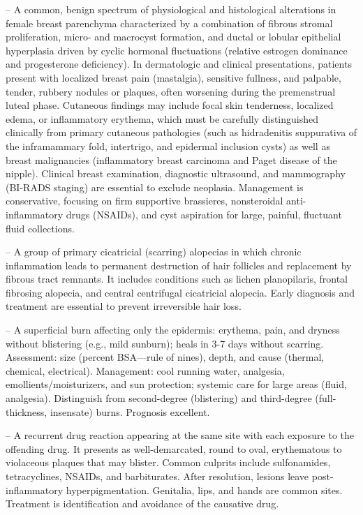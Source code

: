 -- A common, benign spectrum of physiological and histological alterations in female breast parenchyma characterized by a combination of fibrous stromal proliferation, micro- and macrocyst formation, and ductal or lobular epithelial hyperplasia driven by cyclic hormonal fluctuations (relative estrogen dominance and progesterone deficiency). In dermatologic and clinical presentations, patients present with localized breast pain (mastalgia), sensitive fullness, and palpable, tender, rubbery nodules or plaques, often worsening during the premenstrual luteal phase. Cutaneous findings may include focal skin tenderness, localized edema, or inflammatory erythema, which must be carefully distinguished clinically from primary cutaneous pathologies (such as hidradenitis suppurativa of the inframammary fold, intertrigo, and epidermal inclusion cysts) as well as breast malignancies (inflammatory breast carcinoma and Paget disease of the nipple). Clinical breast examination, diagnostic ultrasound, and mammography (BI-RADS staging) are essential to exclude neoplasia. Management is conservative, focusing on firm supportive brassieres, nonsteroidal anti-inflammatory drugs (NSAIDs), and cyst aspiration for large, painful, fluctuant fluid collections.

-- A group of primary cicatricial (scarring) alopecias in which chronic inflammation leads to permanent destruction of hair follicles and replacement by fibrous tract remnants. It includes conditions such as lichen planopilaris, frontal fibrosing alopecia, and central centrifugal cicatricial alopecia. Early diagnosis and treatment are essential to prevent irreversible hair loss.

-- A superficial burn affecting only the epidermis: erythema, pain, and dryness without blistering (e.g., mild sunburn); heals in 3-7 days without scarring. Assessment: size (percent BSA—rule of nines), depth, and cause (thermal, chemical, electrical). Management: cool running water, analgesia, emollients/moisturizers, and sun protection; systemic care for large areas (fluid, analgesia). Distinguish from second-degree (blistering) and third-degree (full-thickness, insensate) burns. Prognosis excellent.

-- A recurrent drug reaction appearing at the same site with each exposure to the offending drug. It presents as well-demarcated, round to oval, erythematous to violaceous plaques that may blister. Common culprits include sulfonamides, tetracyclines, NSAIDs, and barbiturates. After resolution, lesions leave post-inflammatory hyperpigmentation. Genitalia, lips, and hands are common sites. Treatment is identification and avoidance of the causative drug.

